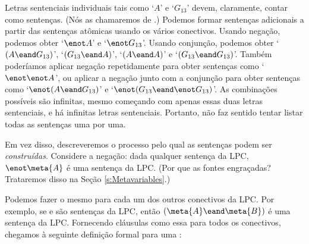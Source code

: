 Letras sentenciais individuais tais como `$A$' e `$G_{13}$' devem, claramente, contar como sentenças.
(Nós as chamaremos de .)
Podemos formar sentenças adicionais a partir das sentenças atômicas usando os vários conectivos.
Usando negação, podemos obter `$\enot A$' e `$\enot G_{13} $'.
Usando conjunção, podemos obter `$(A \eand G_{13})$', `$(G_{13} \eand A)$', `$(A \eand A)$' e `$(G_{13} \eand G_{13})$'.
Também poderíamos aplicar negação repetidamente para obter sentenças como `$\enot\enot A$', ou aplicar a negação junto com a conjunção para obter sentenças como `$\enot(A \eand G_{13})$' e `$\enot(G_{13} \eand \enot G_{13})$'.
As combinações possíveis são infinitas, mesmo começando com apenas essas duas letras sentenciais, e há infinitas letras sentenciais.
Portanto, não faz sentido tentar listar todas as sentenças uma por uma.

Em vez disso, descreveremos o processo pelo qual as sentenças podem ser \emph{construídas}.
Considere a negação: dada qualquer sentença  da LPC, $\enot\meta{A}$ é uma sentença da LPC.
(Por que as fontes engraçadas? Trataremos disso na Seção \ref{s:Metavariables}.)

Podemos fazer o mesmo para cada um dos outros conectivos da LPC.
Por exemplo, se  e  são sentenças da LPC, então $(\meta{A}\eand\meta{B})$ é uma sentença da LPC.
Fornecendo cláusulas como essa para todos os conectivos, chegamos à seguinte definição formal para uma :
{\small 
	}

